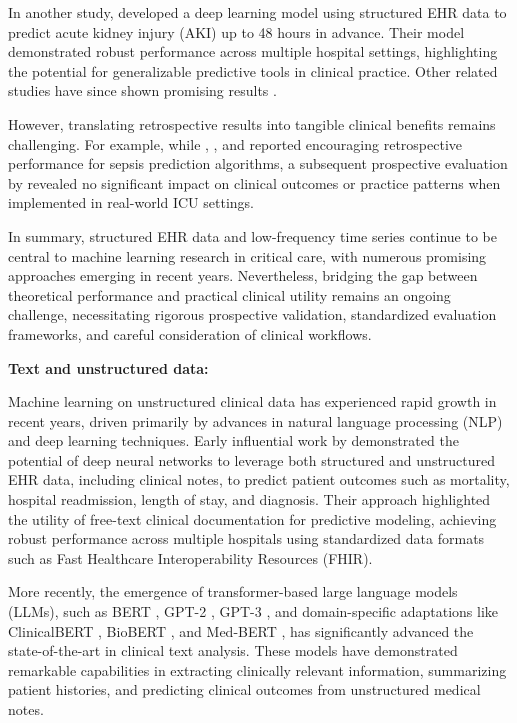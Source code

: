 In another study, \citet{wang2020utilizing} developed a deep learning model using structured EHR data to predict acute kidney injury (AKI) up to 48 hours in advance. Their model demonstrated robust performance across multiple hospital settings, highlighting the potential for generalizable predictive tools in clinical practice. Other related studies have since shown promising results \citep{gottlieb2022machine}.

However, translating retrospective results into tangible clinical benefits remains challenging. For example, while \citet{giannini2019machine}, \citet{nemati2018interpretable}, and \citet{barton2019evaluation} reported encouraging retrospective performance for sepsis prediction algorithms, a subsequent prospective evaluation by \citet{ginestra2019clinician} revealed no significant impact on clinical outcomes or practice patterns when implemented in real-world ICU settings.

In summary, structured EHR data and low-frequency time series continue to be central to machine learning research in critical care, with numerous promising approaches emerging in recent years. Nevertheless, bridging the gap between theoretical performance and practical clinical utility remains an ongoing challenge, necessitating rigorous prospective validation, standardized evaluation frameworks, and careful consideration of clinical workflows.

\vspace{1ex}
\vspace{1ex}
\noindent
\textbf{Text and unstructured data:}

Machine learning on unstructured clinical data has experienced rapid growth in recent years, driven primarily by advances in natural language processing (NLP) and deep learning techniques. Early influential work by \citet{rajkomar2018scalable} demonstrated the potential of deep neural networks to leverage both structured and unstructured EHR data, including clinical notes, to predict patient outcomes such as mortality, hospital readmission, length of stay, and diagnosis. Their approach highlighted the utility of free-text clinical documentation for predictive modeling, achieving robust performance across multiple hospitals using standardized data formats such as Fast Healthcare Interoperability Resources (FHIR).

More recently, the emergence of transformer-based large language models (LLMs), such as BERT \citep{devlin2019bert}, GPT-2 \citep{radford2019language}, GPT-3 \citep{brown2020language}, and domain-specific adaptations like ClinicalBERT \citep{alsentzer2019publicly}, BioBERT \citep{lee2020biobert}, and Med-BERT \citep{rasmy2021med}, has significantly advanced the state-of-the-art in clinical text analysis. These models have demonstrated remarkable capabilities in extracting clinically relevant information, summarizing patient histories, and predicting clinical outcomes from unstructured medical notes.

